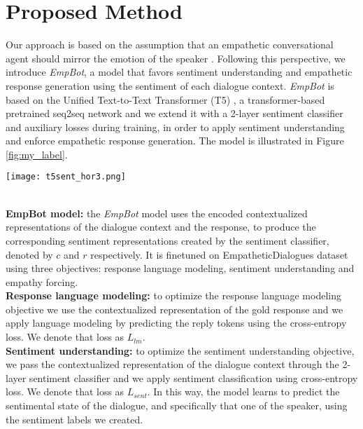 \documentclass[11pt]{article}
\begin{document}
\section{Proposed Method}\label{subsec:ProposedMethod}
Our approach is based on the assumption that an empathetic conversational agent should mirror the emotion of the speaker \citep{Carr_2013}. Following this perspective, we introduce \textit{EmpBot}, a model that favors sentiment understanding and  empathetic response generation using the sentiment of each dialogue context.  \textit{EmpBot} is based on  the Unified
Text-to-Text Transformer (T5) \citep{raffel-unified-transformer-T5}, a transformer-based \citep{vaswani-attention-is-all-you-need} pretrained seq2seq network and we extend it with a 2-layer sentiment classifier and auxiliary losses during training, in order to apply sentiment understanding and enforce empathetic response generation. The model is illustrated in Figure \ref{fig:my_label}. 
\begin{figure*}
    \centering
    \texttt{[image: t5sent\_hor3.png]}
    \caption{Illustration of the \textit{EmpBot} model. The contextualized sentiment representations $c$ and $r$ are used for calculating the sentiment understanding and the empathy forcing  auxiliary losses.}
    \label{fig:my_label}
\end{figure*}
\noindent\\
\textbf{EmpBot model:} the \textit{EmpBot} model uses the encoded contextualized representations of the dialogue context and the response, to produce the corresponding sentiment representations created by the sentiment classifier, denoted by $c$ and $r$ respectively. It is finetuned on EmpatheticDialogues dataset using three objectives: response language modeling, sentiment understanding and empathy forcing.\\
\textbf{Response language modeling:} to optimize the response language modeling objective we use the contextualized representation of the gold response and we apply language modeling by predicting the reply tokens using the cross-entropy loss. We denote that loss as $L_{lm}$.\\
\textbf{Sentiment understanding:} to optimize the sentiment understanding objective, we pass the contextualized representation of the dialogue context through the 2-layer sentiment classifier and we apply sentiment classification using cross-entropy loss. We denote that loss as $L_{sent}$. In this way, the model learns to predict the sentimental state of the dialogue, and specifically that one of the speaker, using the sentiment labels we created.\\
\end{document}
